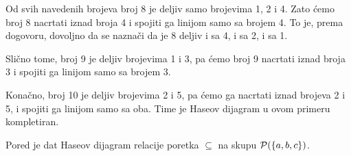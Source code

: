 \bigskip

\noindent
\begin{minipage}{3in}
  Od svih navedenih brojeva broj 8 je deljiv samo brojevima 1, 2 i 4. Zato \'cemo broj 8 nacrtati iznad broja 4 i spojiti ga linijom
  samo sa brojem 4. To je, prema dogovoru, dovoljno da se nazna\v ci da je 8 deljiv i sa 4, i sa 2, i sa 1.
\end{minipage}
\hfill
\begin{minipage}{2.5in}
  \begin{center}
    
  \end{center}
\end{minipage}

\bigskip

\noindent
\begin{minipage}{3in}
  Sli\v cno tome, broj 9 je deljiv brojevima 1 i 3, pa \'cemo broj 9 nacrtati iznad broja 3 i spojiti ga linijom
  samo sa brojem 3.
\end{minipage}
\hfill
\begin{minipage}{2.5in}
  \begin{center}
    
  \end{center}
\end{minipage}

\bigskip

\noindent
\begin{minipage}{3in}
  Kona\v cno, broj 10 je deljiv brojevima 2 i 5, pa \'cemo ga nacrtati iznad brojeva 2 i 5, i spojiti ga linijom
  samo sa oba. Time je Haseov dijagram u ovom primeru kompletiran.
\end{minipage}
\hfill
\begin{minipage}{2.5in}
  \begin{center}
    
  \end{center}
\end{minipage}

\bigskip

\noindent
\begin{minipage}{3in}
  \begin{EX}\label{ft07.ex.P123}
    Pored je dat Haseov dijagram relacije poretka $\subseteq$ na skupu
    $\mathcal{P}(\{a, b, c\})$.
  \end{EX}
\end{minipage}
\hfill
\begin{minipage}{2.5in}
  \begin{center}
    
  \end{center}
\end{minipage}

